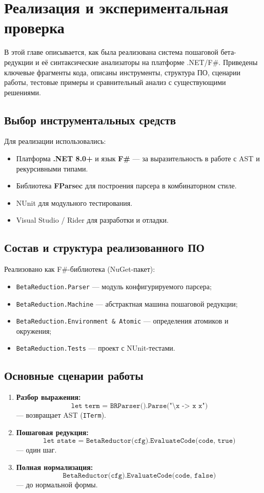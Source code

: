 \chapter{Реализация и экспериментальная проверка}
\label{chapter4}

В этой главе описывается, как была реализована система пошаговой бета-редукции и её синтаксические анализаторы на платформе .NET/F\#. Приведены ключевые фрагменты кода, описаны инструменты, структура ПО, сценарии работы, тестовые примеры и сравнительный анализ с существующими решениями.

\section{Выбор инструментальных средств}
Для реализации использовались:
\begin{itemize}
  \item Платформа \textbf{.NET 8.0+} и язык \textbf{F\#} — за выразительность в работе с AST и рекурсивными типами.
  \item Библиотека \textbf{FParsec} для построения парсера в комбинаторном стиле.
  \item NUnit для модульного тестирования.
  \item Visual Studio / Rider для разработки и отладки.
\end{itemize}

\section{Состав и структура реализованного ПО}
Реализовано как F\#-библиотека (NuGet-пакет):
\begin{itemize}
  \item \texttt{BetaReduction.Parser} — модуль конфигурируемого парсера;
  \item \texttt{BetaReduction.Machine} — абстрактная машина пошаговой редукции;
  \item \texttt{BetaReduction.Environment \& Atomic} — определения атомиков и окружения;
  \item \texttt{BetaReduction.Tests} — проект с NUnit-тестами.
\end{itemize}

\section{Основные сценарии работы}
\begin{enumerate}
  \item \textbf{Разбор выражения:} 
    \[
      \texttt{let term = BRParser().Parse("\textbackslash x -> x x")}
    \]
    — возвращает AST (\texttt{ITerm}).
  \item \textbf{Пошаговая редукция:} 
    \[
      \texttt{let state = BetaReductor(cfg).EvaluateCode(code, true)}
    \]
    — один шаг.
  \item \textbf{Полная нормализация:} 
    \[
      \texttt{BetaReductor(cfg).EvaluateCode(code, false)}
    \]
    — до нормальной формы.
\end{enumerate}

